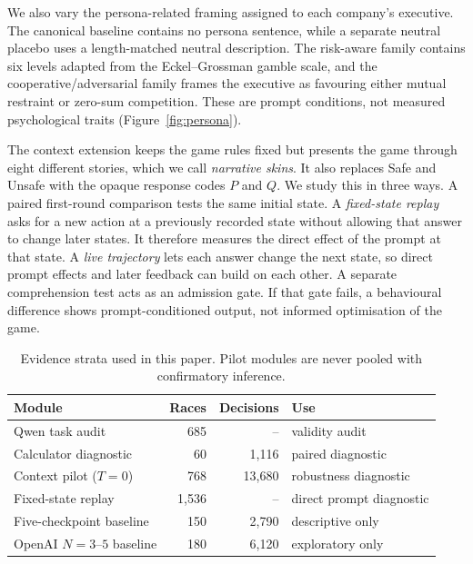 \documentclass[sigconf]{aamas}
\begin{document}
We also vary the persona-related framing assigned to each company's
executive. The canonical baseline contains no persona sentence, while a
separate neutral placebo uses a length-matched neutral description. The
risk-aware family contains six levels adapted from the Eckel--Grossman gamble
scale, and the cooperative/adversarial family frames the executive as favouring
either mutual restraint or zero-sum competition. These are prompt conditions,
not measured psychological traits (Figure~\ref{fig:persona}).


The context extension keeps the game rules fixed but presents the game through
eight different stories, which we call \emph{narrative skins}. It also replaces
Safe and Unsafe with the opaque response codes $P$ and $Q$. We study this in
three ways. A paired first-round comparison tests the same initial state. A
\emph{fixed-state replay} asks for a new action at a previously recorded state
without allowing that answer to change later states. It therefore measures the
direct effect of the prompt at that state. A \emph{live trajectory} lets each
answer change the next state, so direct prompt effects and later feedback can
build on each other. A separate comprehension test acts as an admission gate.
If that gate fails, a behavioural difference shows prompt-conditioned output,
not informed optimisation of the game.

\begin{table}[t]
  \caption{Evidence strata used in this paper. Pilot modules are never pooled with confirmatory inference.}
  \label{tab:evidence-strata}
  \centering
  \footnotesize
  \setlength{\tabcolsep}{3pt}
  \begin{tabular}{@{}p{}rrp{}@{}}
    \toprule
    Module & Races & Decisions & Use \\
    \midrule
    Qwen task audit & 685 & -- & validity audit \\
    Calculator diagnostic & 60 & 1,116 & paired diagnostic \\
    Context pilot ($T=0$) & 768 & 13,680 & robustness diagnostic \\
    Fixed-state replay & 1,536 & -- & direct prompt diagnostic \\
    Five-checkpoint baseline & 150 & 2,790 & descriptive only \\
    OpenAI $N=3$--$5$ baseline & 180 & 6,120 & exploratory only \\
    \bottomrule
  \end{tabular}
\end{table}
\end{document}
